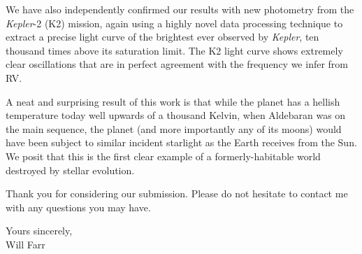 \documentclass[11pt]{letter} %
\begin{document}
\begin{letter}
We have also independently confirmed our results with new photometry from the \emph{Kepler}-2 (K2) mission, again using a highly novel data processing technique to extract a precise light curve of the brightest ever observed by \emph{Kepler}, ten thousand times above its saturation limit. The K2 light curve shows extremely clear oscillations that are in perfect agreement with the frequency we infer from RV. 

A neat and surprising result of this work is that while the planet has a hellish temperature today well upwards of a thousand Kelvin, when Aldebaran was on the main sequence, the planet (and more importantly any of its moons) would have been subject to similar incident starlight as the Earth receives from the Sun. We posit that this is the first clear example of a formerly-habitable world destroyed by stellar evolution.

Thank you for considering our submission. Please do not hesitate to contact me with any questions you may have.\\

\closing{Yours sincerely, \\
\vspace{1.75cm}
Will Farr} 
  

\end{letter}
 
\end{document}
